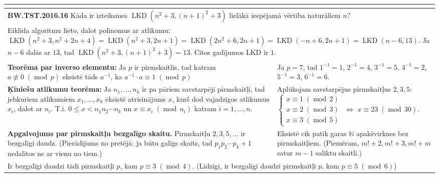 \documentclass[a4paper]{article}
\begin{document}
\begin{table}[ht!]
{\begin{tabular*}{18.46cm}{@{}|p{10.35cm}|p{7.25cm}|@{}}
{{}
} \\ \hline 
\multicolumn{2}{|p{18.05cm}|}{
\cellcolor[HTML]{E1FFE1}
{\bf BW.TST.2016.16} Kāda ir izteiksmes $\operatorname{LKD}\left(n^2+3,(n+1)^2+3\right)$
lielākā iespējamā vērtība naturāliem $n$?
} \\ \hline
\multicolumn{2}{|p{18.05cm}|}{
{\footnotesize
Eiklīda algoritmu lieto, dalot polinomus ar atlikumu:
$\operatorname{LKD} \left( n^2 + 3, n^2 + 2n + 4 \right) = 
\operatorname{LKD} \left( n^2 + 3, 2n+1 \right) = 
\operatorname{LKD}\left( 2n^2 + 6, 2n+1 \right) = 
\operatorname{LKD} \left( -n + 6, 2n+1 \right) = \operatorname{LKD} \left(n-6, 13 \right)$. Ja $n-6$ dalās ar $13$, tad 
$\operatorname{LKD}\left(n^2+3,(n+1)^2+3\right)=13$. Citos gadījumos LKD ir $1$.
}
} \\ \hline
{\bf Teorēma par inverso elementu:} Ja $p$ ir pirmskaitlis, tad katram $a \not\equiv 0\;(\operatorname{mod}\,p)$
eksistē tāds $a^{-1}$, ka $a^{-1}\cdot{}a \equiv 1\;(\operatorname{mod}\,p)$ &
Ja $p=7$, tad $1^{-1}=1$, $2^{-1}=4$, $3^{-1}=5$, $4^{-1}=2$, $5^{-1}=3$, $6^{-1}=6$.  \\ \hline
{\bf Ķīniešu atlikumu teorēma:} Ja $n_1,\ldots,n_k$ ir pa pāriem savstarpēji pirmskaitļi, 
tad jebkuriem atlikumiem $x_1,\ldots,x_k$ eksistē atrisinājums $x$, kurš dod vajadzīgos atlikumus
$x_i$, dalot ar $n_i$. T.i. $0 \leq x < n_1n_2\cdots{}n_k$ un 
$x \equiv x_i\;(\operatorname{mod}\,n_i)$ katram $i=1,\ldots,n$.
& Aplūkojam savstarpējus pirmskaitļus $2,3,5$:\newline $\left\{ \begin{array}{c}
x\equiv{}1\;(\operatorname{mod}\,2) \\
x\equiv{}2\;(\operatorname{mod}\,3) \\
x\equiv{}3\;(\operatorname{mod}\,5) 
\end{array} \right.$ $\Leftrightarrow$ $x \equiv 23\;(\operatorname{mod}\,30)$. \\ \hline
{\bf Apgalvojums par pirmskaitļu bezgalīgo skaitu.} Pirmskaitļu $2,3,5,\ldots$ ir bezgalīgi daudz. 
(Pierādījums no pretējā: ja būtu galīgs skaits, tad $p_1p_2\cdots{}p_k+1$ 
nedalītos ne ar vienu no tiem.) & 
Eksistē cik patīk garas $\mathbb{N}$ apakšvirknes bez pirmskaitļiem. 
(Piemēram, $m!+2, m!+3, m!+m$ satur $m-1$ saliktu skaitli.) \\ \hline
\multicolumn{2}{|p{18.05cm}|}{
\cellcolor[HTML]{E1FFE1}
Ir bezgalīgi daudzi tādi pirmskaitļi $p$, kam $p \equiv 3\;(\operatorname{mod}\,4)$. (Līdzīgi, ir 
bezgalīgi daudzi pirmskaitļi $p$, kam $p \equiv 5 \;(\operatorname{mod}\,6)$) 
}
\end{tabular*}}
\end{table}
\end{document}

